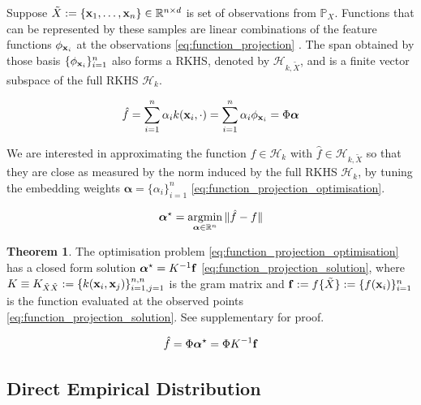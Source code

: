 \documentclass[twoside]{article} \usepackage{aistats2017}
\theoremstyle{definition}
\theoremstyle{theorem}
\newtheorem{theorem}{Theorem}[section]
\newcommand{\argmin}{\operatornamewithlimits{argmin}}
\newcommand{\rv}[1]{{#1}}
\newcommand{\ds}[1]{\tilde{#1}}
\begin{document}
		Suppose $\ds{X} := \{\bvec{x}_{1}, \dots, \bvec{x}_{n}\} \in \mathbb{R}^{n \times d}$ is set of observations from $\mathbb{P}_{\rv{X}}$. Functions that can be represented by these samples are linear combinations of the feature functions $\phi_{\mathbf{x}_{i}}$ at the observations \eqref{eq:function_projection} \citep{muandet2016kernel}. The span obtained by those basis $\{\phi_{\mathbf{x}_{i}}\}_{i = 1}^{n}$ also forms a RKHS, denoted by $\mathcal{H}_{k, \ds{X}}$, and is a finite vector subspace of the full RKHS $\mathcal{H}_{k}$.
		
		\begin{equation}
			\hat{f} = \sum_{i = 1}^{n} \alpha_{i} k(\mathbf{x}_{i}, \cdot) = \sum_{i = 1}^{n} \alpha_{i} \phi_{\mathbf{x}_{i}} = \Phi \bm{\alpha}
		\label{eq:function_projection}
		\end{equation}
	
		We are interested in approximating the function $f \in \mathcal{H}_{k}$ with $\hat{f} \in \mathcal{H}_{k, \ds{X}}$ so that they are close as measured by the norm induced by the full RKHS $\mathcal{H}_{k}$, by tuning the embedding weights $\bm{\alpha} = \{\alpha_{i}\}_{i = 1}^{n}$ \eqref{eq:function_projection_optimisation}.
			
		\begin{equation}
			\bm{\alpha}^{\star} = \argmin_{\bm{\alpha} \in \mathbb{R}^{n}} \Vert \hat{f} - f \Vert
		\label{eq:function_projection_optimisation}
		\end{equation}
		
		\begin{theorem} \label{thm:function_projection_solution}
			The optimisation problem \eqref{eq:function_projection_optimisation} has a closed form solution $\bm{\alpha}^{\star} = K^{-1} \mathbf{f}$ \eqref{eq:function_projection_solution}, where $K \equiv K_{\ds{X} \ds{X}} := \{k(\bvec{x}_{i}, \bvec{x}_{j})\}_{i = 1, j = 1}^{n, n}$ is the gram matrix and $\bvec{f} := f\{\ds{X}\} := \{f(\bvec{x}_{i})\}_{i = 1}^{n}$ is the function evaluated at the observed points \eqref{eq:function_projection_solution}. See supplementary for proof.
			
			\begin{equation}
				\hat{f} = \Phi \bm{\alpha}^{\star} = \Phi K^{-1} \mathbf{f}
			\label{eq:function_projection_solution}
			\end{equation}
		\end{theorem}
		
	\subsection{Direct Empirical Distribution}
	\label{sec:direct_quantile_regression:optimal_empirical_distribution}
	
\end{document}

